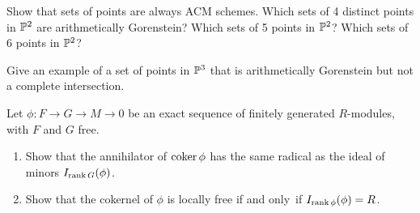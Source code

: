 \begin{exercise}
Show that sets of points are always ACM schemes. 
%
Which sets of 4 distinct points in $\PP^2$ are arithmetically
Gorenstein? Which sets of 5 points in $\PP^2$? Which sets of 6 points in $\PP^2$?
\end{exercise}

\begin{exercise}
Give an example of a set of points in $\PP^3$ that is arithmetically
%
Gorenstein but not a complete intersection.
\end{exercise}

\begin{exercise}
\label{Fitt}
Let $\phi: F\to G \to M\to 0$ be an exact sequence of finitely generated
$R$-modules,
with $F$ and $G$ free.

\begin{enumerate}
\item Show that the annihilator of  $\coker \phi$ has the
same radical as the ideal 
of minors
$I_{\rank G}(\phi)$.
\item 
Show that the cokernel of $\phi$
is locally free if and only~if $I_{\rank \phi}(\phi)= R$.
\end{enumerate}
\end{exercise}


